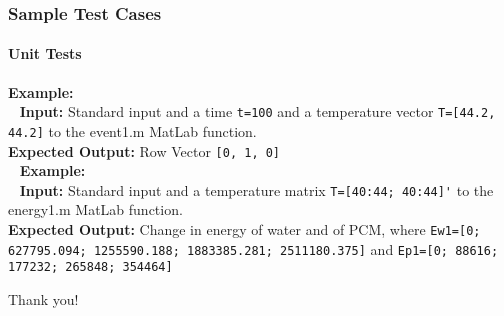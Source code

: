 \documentclass{beamer}
\begin{document}
\begin{frame}[fragile]
	\frametitle{Sample Test Cases}
	\framesubtitle{Unit Tests}
	\textbf{Example:}\\
	~\newline
	\textbf{Input:} Standard input and a time \verb|t=100| and a temperature vector \verb|T=[44.2, 44.2]| to the event1.m MatLab function.\\
	\textbf{Expected Output:} Row Vector \verb|[0, 1, 0]|\\
	~\newline
	\textbf{Example:}\\
	~\newline
	\textbf{Input:} Standard input and a temperature matrix \verb|T=[40:44; 40:44]'| to the energy1.m MatLab function.\\
	\textbf{Expected Output:} Change in energy of water and of PCM, where \verb|Ew1=[0; 627795.094; 1255590.188; 1883385.281; 2511180.375]| and \verb|Ep1=[0; 88616; 177232; 265848; 354464]|\\
\end{frame}

\begin{frame}
	\centering
	\huge Thank you!
\end{frame}
\end{document}
